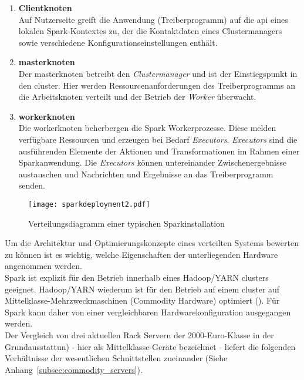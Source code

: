 \begin{enumerate}
	\item \textbf{Clientknoten}\\
	Auf Nutzerseite greift die Anwendung (Treiberprogramm) auf die \gls{api} eines lokalen Spark-Kontextes zu, der die Kontaktdaten eines Clustermanagers sowie verschiedene Konfigurationseinstellungen enthält. 
	
	\item \textbf{\gls{master}knoten}\\
	Der \gls{master}knoten betreibt den \textit{Clustermanager} und ist der Einstiegspunkt in den \gls{cluster}. Hier werden Ressourcenanforderungen des Treiberprogramms an die Arbeitsknoten verteilt und der Betrieb der \textit{Worker} überwacht.
	
	\item \textbf{\gls{worker}knoten}\\
	Die \gls{worker}knoten beherbergen die Spark Workerprozesse. Diese melden verfügbare Ressourcen und erzeugen bei Bedarf \textit{Executors}. \textit{Executors} sind die ausführenden Elemente der Aktionen und Transformationen im Rahmen einer Sparkanwendung. Die \textit{Executors} können untereinander Zwischenergebnisse austauschen und Nachrichten und Ergebnisse an das Treiberprogramm senden.
\end{enumerate}

\begin{figure}[ht!]
	\centering
  \texttt{[image: sparkdeployment2.pdf]}
	\caption{Verteilungsdiagramm einer typischen Sparkinstallation}
	\label{fig:sparkdeployment}
\end{figure}

Um die Architektur und Optimierungskonzepte eines verteilten Systems bewerten zu können ist es wichtig, welche Eigenschaften der unterliegenden Hardware angenommen werden.\\

Spark ist explizit für den Betrieb innerhalb eines Hadoop/YARN \gls{cluster}s geeignet. Hadoop/YARN wiederum ist für den Betrieb auf einem \gls{cluster} auf Mittelklasse-Mehrzweckmaschinen (Commodity Hardware) optimiert (\cite{Mer14}). Für Spark kann daher von einer vergleichbaren Hardwarekonfiguration ausgegangen werden.\\

Der Vergleich von drei aktuellen Rack Servern der 2000-Euro-Klasse in der Grundausstattun) - hier als Mittelklasse-Geräte bezeichnet - liefert die folgenden Verhältnisse der wesentlichen Schnittstellen zueinander (Siehe Anhang~\ref{subsec:commodity_servers}).


